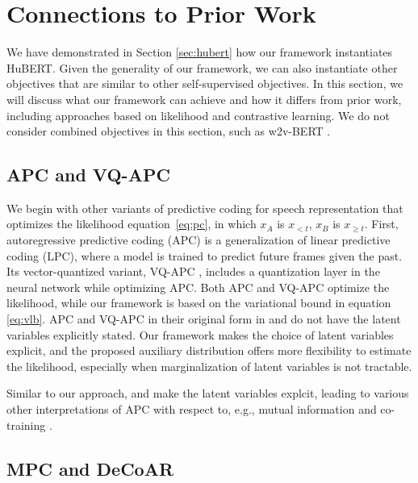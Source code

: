 \documentclass[11pt,a4paper]{article}
\def\eqref#1{equation~\ref{#1}}
\begin{document}
\section{Connections to Prior Work}
\label{sec:related}

We have demonstrated in Section \ref{sec:hubert} how our framework
instantiates HuBERT.
Given the generality of our framework, we can also instantiate other objectives that are similar to other self-supervised objectives.
In this section, we will discuss what our framework can achieve and how it differs from prior work,
including approaches based on likelihood and contrastive learning.
We do not consider combined objectives in this section, such as
w2v-BERT \citep{chung2021w2v}.
%
%

\subsection{APC and VQ-APC}

We begin with other variants of predictive coding for speech representation that optimizes the likelihood
\eqref{eq:pc}, in which $x_A$ is $x_{<t}$, $x_B$ is $x_{\geq t}$.
First, autoregressive predictive coding \citep{chung2019unsupervised,yang2022autoregressive} (APC) is a generalization of linear predictive coding \citep{atal1971speech,saito1967theoretical} (LPC), 
where a model is trained to predict future frames given the past.
Its vector-quantized variant, VQ-APC \citep{chung2020vector}, 
includes a quantization layer in the neural network while optimizing APC.
Both APC and VQ-APC optimize the likelihood, while our framework is based on the variational bound in equation \ref{eq:vlb}.
APC and VQ-APC in their original form in \citet{chung2019unsupervised} and \citet{chung2020vector} do not have the latent variables explicitly stated.
Our framework makes the choice of latent variables explicit, and the proposed auxiliary distribution 
offers more flexibility to estimate the likelihood, especially when marginalization of 
latent variables is not tractable.

Similar to our approach, \citet{yang2022autoregressive} and \citet{yeh2022autoregressive} make the latent variables explcit, leading to various other interpretations of APC with respect to, e.g., mutual information and co-training \citep{mcallester2018information}.

\subsection{MPC and DeCoAR}
\end{document}
